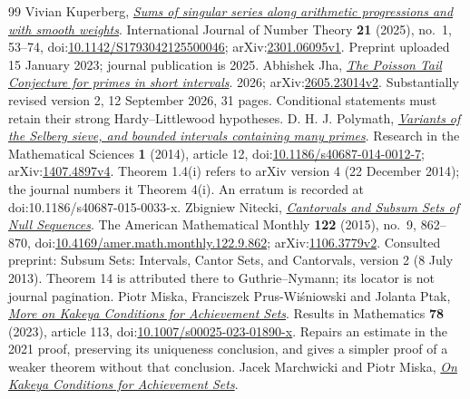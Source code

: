 \begin{thebibliography}{99}
 Vivian Kuperberg, \href{https://arxiv.org/abs/2301.06095v1}{\emph{Sums of singular series along arithmetic progressions and with smooth weights}}.
  International Journal of Number Theory \textbf{21} (2025), no.~1, 53--74, doi:\href{https://doi.org/10.1142/S1793042125500046}{10.1142/S1793042125500046}; arXiv:\href{https://arxiv.org/abs/2301.06095v1}{2301.06095v1}. Preprint uploaded 15 January 2023; journal publication is 2025.
 Abhishek Jha, \href{https://arxiv.org/abs/2605.23014v2}{\emph{The Poisson Tail Conjecture for primes in short intervals}}.
  2026; arXiv:\href{https://arxiv.org/abs/2605.23014v2}{2605.23014v2}. Substantially revised version 2, 12 September 2026, 31 pages. Conditional statements must retain their strong Hardy--Littlewood hypotheses.
 {D. H. J. Polymath}, \href{https://arxiv.org/abs/1407.4897v4}{\emph{Variants of the Selberg sieve, and bounded intervals containing many primes}}.
  Research in the Mathematical Sciences \textbf{1} (2014), article 12, doi:\href{https://doi.org/10.1186/s40687-014-0012-7}{10.1186/s40687-014-0012-7}; arXiv:\href{https://arxiv.org/abs/1407.4897v4}{1407.4897v4}. Theorem 1.4(i) refers to arXiv version 4 (22 December 2014); the journal numbers it Theorem 4(i). An erratum is recorded at doi:10.1186/s40687-015-0033-x.
 Zbigniew Nitecki, \href{https://arxiv.org/abs/1106.3779v2}{\emph{Cantorvals and Subsum Sets of Null Sequences}}.
  The American Mathematical Monthly \textbf{122} (2015), no.~9, 862--870, doi:\href{https://doi.org/10.4169/amer.math.monthly.122.9.862}{10.4169/amer.math.monthly.122.9.862}; arXiv:\href{https://arxiv.org/abs/1106.3779v2}{1106.3779v2}. Consulted preprint: Subsum Sets: Intervals, Cantor Sets, and Cantorvals, version 2 (8 July 2013). Theorem 14 is attributed there to Guthrie--Nymann; its locator is not journal pagination.
 Piotr Miska, Franciszek Prus-Wi\'sniowski and Jolanta Ptak, \href{https://ruj.uj.edu.pl/server/api/core/bitstreams/d6630f7b-e6ee-4de8-8a1b-81c7b4c59d2e/content}{\emph{More on Kakeya Conditions for Achievement Sets}}.
  Results in Mathematics \textbf{78} (2023), article 113, doi:\href{https://doi.org/10.1007/s00025-023-01890-x}{10.1007/s00025-023-01890-x}. Repairs an estimate in the 2021 proof, preserving its uniqueness conclusion, and gives a simpler proof of a weaker theorem without that conclusion.
 Jacek Marchwicki and Piotr Miska, \href{https://link.springer.com/article/10.1007/s00025-021-01479-2}{\emph{On Kakeya Conditions for Achievement Sets}}.

\end{thebibliography}
